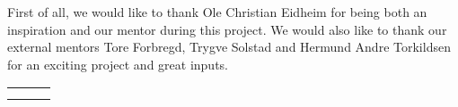 \documentclass[a4paper, 11pt, oneside]{Thesis}  %
\begin{document}
{%
% 

First of all, we would like to thank Ole Christian Eidheim for being both an inspiration and our mentor during this project. We would also like to thank our external mentors Tore Forbregd, Trygve Solstad and Hermund Andre Torkildsen for an exciting project and great inputs. %





\vfill

\begin{tabularx}{\textwidth}{XXX}
\centering{$\rule{4cm}{0.15mm}$} & \centering{$\rule{4cm}{0.15mm}$} & \centering{$\rule{4cm}{0.15mm}$} \tabularnewline
\centering{Even Dalen} & \centering{Håvard Langdal} & \centering{Torkil Solheim} \\
\end{tabularx}

\centering{\mydate}\\


}

\clearpage  %
\end{document}
